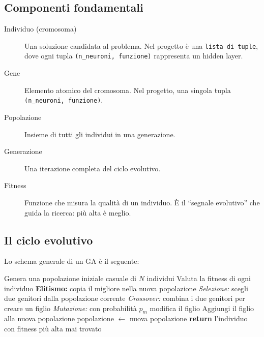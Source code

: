 \documentclass[11pt,a4paper]{article}
\begin{document}
\subsection{Componenti fondamentali}

\begin{description}
    \item[Individuo (cromosoma)] Una soluzione candidata al problema.
        Nel progetto è una \texttt{lista di tuple}, dove ogni tupla
        \texttt{(n\_neuroni, funzione)} rappresenta un hidden layer.
    \item[Gene] Elemento atomico del cromosoma. Nel progetto, una singola
        tupla \texttt{(n\_neuroni, funzione)}.
    \item[Popolazione] Insieme di tutti gli individui in una generazione.
    \item[Generazione] Una iterazione completa del ciclo evolutivo.
    \item[Fitness] Funzione che misura la qualità di un individuo. È il
        ``segnale evolutivo'' che guida la ricerca: più alta è meglio.
\end{description}

\subsection{Il ciclo evolutivo}

Lo schema generale di un GA è il seguente:

\begin{algorithm}[H]
\caption{Algoritmo Genetico (schema generale)}
\begin{algorithmic}[1]
\State Genera una popolazione iniziale casuale di $N$ individui
\Repeat
    \State Valuta la fitness di ogni individuo
    \State \textbf{Elitismo:} copia il migliore nella nuova popolazione
        \State \emph{Selezione:} scegli due genitori dalla popolazione corrente
        \State \emph{Crossover:} combina i due genitori per creare un figlio
        \State \emph{Mutazione:} con probabilità $p_m$ modifica il figlio
        \State Aggiungi il figlio alla nuova popolazione
    \EndWhile
    \State popolazione $\gets$ nuova popolazione
\State \textbf{return} l'individuo con fitness più alta mai trovato
\end{algorithmic}
\end{algorithm}
\end{document}

